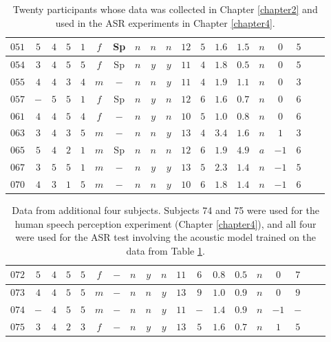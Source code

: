 \begin{table}
\begin{tabular}{|c||c|c|c|c|c|c|c|c|c|c|c|c|c|c|c|c|c|c|}
\textbf{$051$} & $5$ & $4$ & $5$ & $1$ & $f$ & Sp & $n$ & $n$ & $n$ & $12$ & $5$ & $1.6$ & $1.5$ & $n$ & $0$ & $5$ \\ \hline
\textbf{$054$} & $3$ & $4$ & $5$ & $5$ & $f$ & Sp & $n$ & $y$ & $y$ & $11$ & $4$ & $1.8$ & $0.5$ & $n$ & $0$ & $5$ \\ \hline
\textbf{$055$} & $4$ & $4$ & $3$ & $4$ & $m$ & $-$ & $n$ & $n$ & $y$ & $11$ & $4$ & $1.9$ & $1.1$ & $n$ & $0$ & $3$  \\ \hline
\textbf{$057$} & $-$ & $5$ & $5$ & $1$ & $f$ & Sp & $n$ & $y$ & $n$ & $12$ & $6$ & $1.6$ & $0.7$ & $n$ & $0$ & $6$ \\ \hline
\textbf{$061$} & $4$ & $4$ & $5$ & $4$ & $f$ & $-$ & $n$ & $y$ & $n$ & $10$ & $5$ & $1.0$ & $0.8$ & $n$ & $0$ & $6$ \\ \hline
\textbf{$063$} & $3$ & $4$ & $3$ & $5$ & $m$ & $-$ & $n$ & $n$ & $y$ & $13$ & $4$ & $3.4$ & $1.6$ & $n$ & $1$ & $3$  \\ \hline
\textbf{$065$} & $5$ & $4$ & $2$ & $1$ & $m$ & Sp & $n$ & $n$ & $n$ & $12$ & $6$ & $1.9$ & $4.9$ & $a$ & $-1$ & $6$  \\ \hline
\textbf{$067$} & $3$ & $5$ & $5$ & $1$ & $m$ & $-$ & $n$ & $y$ & $y$ & $13$ & $5$ & $2.3$ & $1.4$ & $n$ & $-1$ & $5$ \\ \hline
\textbf{$070$} & $4$ & $3$ & $1$ & $5$ & $m$ & $-$ & $n$ & $n$ & $y$ & $10$ & $6$ & $1.8$ & $1.4$ & $n$ & $-1$ & $6$ \\ \hline
\end{tabular}
\caption{Twenty participants whose data was collected in Chapter \ref{chapter2} and used in the ASR experiments in Chapter \ref{chapter4}.}\label{tab:expt1-data}
\end{table}

\begin{table}
\centering
\begin{tabular}{|c||c|c|c|c|c|c|c|c|c|c|c|c|c|c|c|c|c|c|}\hline
\textbf{$072$} & $5$ & $4$ & $5$ & $5$ & $f$ & $-$ & $n$ & $y$ & $n$ & $11$ & $6$ & $0.8$ & $0.5$ & $n$ & $0$ & $7$ \\ \hline
\textbf{$073$} & $4$ & $4$ & $5$ & $5$ & $m$ & $-$ & $n$ & $n$ & $y$ & $13$ & $9$ & $1.0$ & $0.9$ & $n$ & $0$ & $9$ \\ \hline
\textbf{$074$} & $-$ & $4$ & $5$ & $5$ & $m$ & $-$ & $n$ & $n$ & $y$ & $11$ & $-$ & $1.4$ & $0.9$ & $n$ & $-1$ & $-$  \\ \hline
\textbf{$075$} & $3$ & $4$ & $2$ & $3$ & $f$ & $-$ & $n$ & $y$ & $y$ & $13$ & $5$ & $1.6$ & $0.7$ & $n$ & $1$ & $5$ \\ \hline
\end{tabular}
\caption{Data from additional four subjects.  Subjects 74 and 75 were used for the human speech perception experiment (Chapter \ref{chapter4}), and all four were used for the ASR test involving the acoustic model trained on the data from Table \ref{tab:expt1-data}.}\label{tab:expt2-stims}
\end{table}

